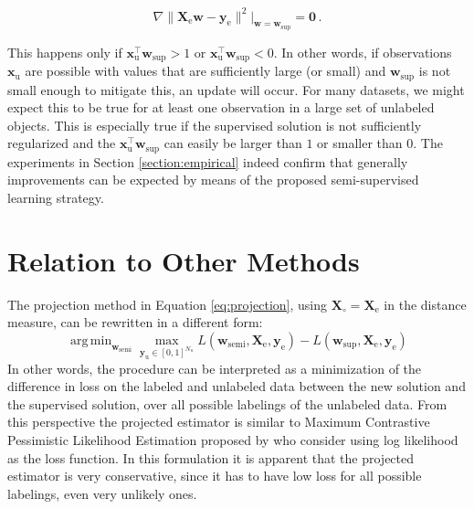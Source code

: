 \documentclass[sts,preprint]{imsart-custom}
\newcommand{\Xe}{\vec{X}_\mathrm{e}  }
\renewcommand{\vec}[1]{\mathbf{#1}}
\DeclareMathOperator*{\argmin}{arg\,min}
\begin{document}
\begin{equation}
\nabla \lVert \vec{X}_\text{e} \vec{w} - \vec{y}_\text{e} \rVert^2\bigg|_{\vec{w}=\vec{w}_\text{sup}}=\vec{0}  \, . \nonumber
\end{equation}

This happens only if $\vec{x}_\text{u}^\top \vec{w}_\text{sup} > 1$ or $\vec{x}_\text{u}^\top \vec{w}_\text{sup} < 0$. In other words, if observations $\vec{x}_\text{u}$ are possible with values that are sufficiently large (or small) and $\vec{w}_\text{sup}$ is not small enough to mitigate this, an update will occur. For many datasets, we might expect this to be true for at least one observation in a large set of unlabeled objects. This is especially true if the  supervised solution is not sufficiently regularized and the $\vec{x}_\text{u}^\top \vec{w}_\text{sup}$ can easily be larger than $1$ or smaller than $0$. The experiments in Section \ref{section:empirical} indeed confirm that generally improvements can be expected by means of the proposed semi-supervised learning strategy.

\section{Relation to Other Methods}
\label{section:interpretations}
The projection method in Equation \eqref{eq:projection}, using $\vec{X}_{\circ}=\Xe$ in the distance measure, can be rewritten in a different form:
\begin{equation}
\argmin_{\vec{w}_\text{semi}} \max_{\vec{y}_\text{u} \in [0,1]^{N_u}} L(\vec{w}_\text{semi},\Xe,\vec{y}_\text{e}) - L(\vec{w}_\text{sup},\Xe,\vec{y}_\text{e}) \nonumber
\end{equation}
In other words, the procedure can be interpreted as a minimization of the difference in loss on the labeled and unlabeled data between the new solution and the supervised solution, over all possible labelings of the unlabeled data. From this perspective the projected estimator is similar to Maximum Contrastive Pessimistic Likelihood Estimation proposed by \citet{Loog2016} who consider using log likelihood as the loss function. In this formulation it is apparent that the projected estimator is very conservative, since it has to have low loss for all possible labelings, even very unlikely ones.
\end{document}
